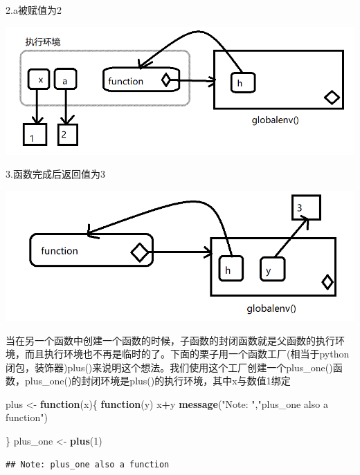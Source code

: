 \documentclass[]{book}
\newenvironment{Shaded}{\begin{snugshade}}{\end{snugshade}}
\newcommand{\KeywordTok}[1]{\textcolor[rgb]{0.13,0.29,0.53}{\textbf{#1}}}
\newcommand{\DecValTok}[1]{\textcolor[rgb]{0.00,0.00,0.81}{#1}}
\newcommand{\StringTok}[1]{\textcolor[rgb]{0.31,0.60,0.02}{#1}}
\newcommand{\ControlFlowTok}[1]{\textcolor[rgb]{0.13,0.29,0.53}{\textbf{#1}}}
\newcommand{\OperatorTok}[1]{\textcolor[rgb]{0.81,0.36,0.00}{\textbf{#1}}}
\newcommand{\NormalTok}[1]{#1}
\begin{document}
2.a被赋值为2

\begin{center}\includegraphics{img/ch7-11} \end{center}

3.函数完成后返回值为3

\begin{center}\includegraphics{img/ch7-12} \end{center}

当在另一个函数中创建一个函数的时候，子函数的封闭函数就是父函数的执行环境，而且执行环境也不再是临时的了。下面的栗子用一个函数工厂(相当于python闭包，装饰器)plus()来说明这个想法。我们使用这个工厂创建一个plus\_one()函数，plus\_one()的封闭环境是plus()的执行环境，其中x与数值1绑定

\begin{Shaded}
\begin{Highlighting}[]
\NormalTok{plus <-}\StringTok{ }\ControlFlowTok{function}\NormalTok{(x)\{}
  \ControlFlowTok{function}\NormalTok{(y) x}\OperatorTok{+}\NormalTok{y}
  \KeywordTok{message}\NormalTok{(}\StringTok{"Note: "}\NormalTok{,}\StringTok{"plus_one also a function"}\NormalTok{)}
  
\NormalTok{\}}
\NormalTok{plus_one <-}\StringTok{ }\KeywordTok{plus}\NormalTok{(}\DecValTok{1}\NormalTok{)}
\end{Highlighting}
\end{Shaded}

\begin{verbatim}
## Note: plus_one also a function
\end{verbatim}
\end{document}
